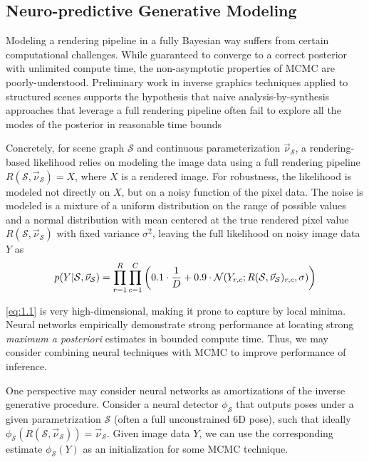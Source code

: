   \subsection{Neuro-predictive Generative Modeling}

    Modeling a rendering pipeline in a fully Bayesian way suffers from certain
    computational challenges. While guaranteed to converge to a correct
    posterior with unlimited compute time, the non-asymptotic properties of
    MCMC are poorly-understood. Preliminary work in inverse graphics techniques
    applied to structured scenes supports the hypothesis that naive
    analysis-by-synthesis approaches that leverage a full rendering pipeline
    often fail to explore all the modes of the posterior in reasonable time bounds
    \todo[WHO?]

    Concretely, for scene graph $\mathcal{S}$ and continuous parameterization
    $\vec{\nu}_\mathcal{S}$, a rendering-based likelihood relies on modeling
    the image data using a full rendering pipeline $R(\mathcal{S},
    \vec{\nu}_\mathcal{S}) = X$, where $X$ is a rendered image. For robustness,
    the likelihood is modeled not directly on $X$, but on a noisy function of
    the pixel data. The noise is modeled is a mixture of a uniform distribution
    on the range of possible values and a normal distribution with mean
    centered at the true rendered pixel value $R(\mathcal{S},
    \vec{\nu}_\mathcal{S})$ with fixed variance $\sigma^2$, leaving the full
    likelihood on noisy image data $Y$ as
    \begin{equation} \label{eq:1.1}
      p(Y | \mathcal{S}, \vec{\nu}_\mathcal{S}) = \prod_{r=1}^R\prod_{c=1}^C \left( 0.1 \cdot \frac{1}{D} + 0.9 \cdot \mathcal{N}(Y_{r,c}; R(\mathcal{S}, \vec{\nu}_\mathcal{S})_{r,c},\sigma) \right)
    \end{equation}

    \ref{eq:1.1} is very high-dimensional, making it prone to capture by local
    minima. Neural networks empirically demonstrate strong performance at
    locating strong \textit{maximum a posteriori} estimates in bounded compute
    time. Thus, we may consider combining neural techniques with MCMC to
    improve performance of inference.
    
    One perspective may consider neural networks as amortizations of the
    inverse generative procedure. Consider a neural detector $\phi_\mathcal{S}$
    that outputs poses under a given parametrization $\mathcal{S}$ (often a
    full unconstrained 6D pose), such that ideally $\phi_\mathcal{S}(R(\mathcal{S},
    \vec{\nu}_\mathcal{S})) = \vec{\nu}_\mathcal{S}$. Given image data $Y$, we
    can use the corresponding estimate $\phi_\mathcal{S}(Y)$ as an
    initialization for some MCMC technique.
    
